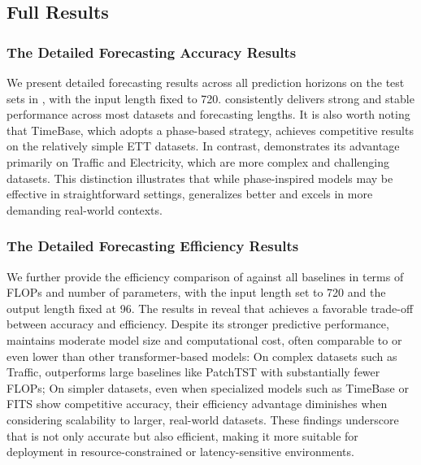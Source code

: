 \subsection{Full Results}
\label{sec:full_results}

\subsubsection{The Detailed Forecasting Accuracy Results}
\label{sec:accuracy_details}
We present detailed forecasting results across all prediction horizons on the test sets in , with the input length fixed to 720.
\sysname consistently delivers strong and stable performance across most datasets and forecasting lengths. 
It is also worth noting that TimeBase, which adopts a phase-based strategy, achieves competitive results on the relatively simple ETT datasets. 
In contrast, \sysname demonstrates its advantage primarily on Traffic and Electricity, which are more complex and challenging datasets. 
This distinction illustrates that while phase-inspired models may be effective in straightforward settings, \sysname generalizes better and excels in more demanding real-world contexts.


\subsubsection{The Detailed Forecasting Efficiency Results}
\label{sec:efficiency_details}

We further provide the efficiency comparison of \sysname against all baselines in terms of FLOPs and number of parameters, with the input length set to 720 and the output length fixed at 96.
The results in  reveal that \sysname achieves a favorable trade-off between accuracy and efficiency. Despite its stronger predictive performance, \sysname maintains moderate model size and computational cost, often comparable to or even lower than other transformer-based models:
On complex datasets such as Traffic, \sysname outperforms large baselines like PatchTST with substantially fewer FLOPs;
On simpler datasets, even when specialized models such as TimeBase or FITS show competitive accuracy, their efficiency advantage diminishes when considering scalability to larger, real-world datasets.
These findings underscore that \sysname is not only accurate but also efficient, making it more suitable for deployment in resource-constrained or latency-sensitive environments.


